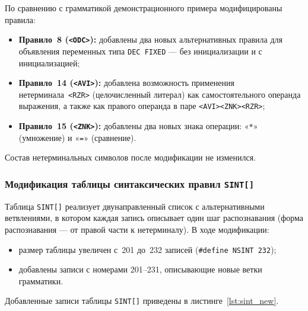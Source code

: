 \documentclass[a4paper,14pt]{extarticle}
\begin{document}
По сравнению с грамматикой демонстрационного примера модифицированы правила:
\begin{itemize}
  \item \textbf{Правило~8 (\texttt{<ODC>}):} добавлены два новых альтернативных
        правила для объявления переменных типа \texttt{DEC FIXED} — без
        инициализации и с инициализацией;
  \item \textbf{Правило~14 (\texttt{<AVI>}):} добавлена возможность применения
        нетерминала~\texttt{<RZR>} (целочисленный литерал) как самостоятельного
        операнда выражения, а также как правого операнда в паре
        \texttt{<AVI><ZNK><RZR>};
  \item \textbf{Правило~15 (\texttt{<ZNK>}):} добавлены два новых знака операции:
        «\texttt{*}» (умножение) и «\texttt{=}» (сравнение).
\end{itemize}

Состав нетерминальных символов после модификации не изменился.

\subsubsection*{Модификация таблицы синтаксических правил \texttt{SINT[]}}

Таблица \texttt{SINT[]} реализует двунаправленный список с альтернативными
ветвлениями, в котором каждая запись описывает один шаг распознавания (форма
распознавания — от правой части к нетерминалу). В ходе модификации:

\begin{itemize}
  \item размер таблицы увеличен с~201 до~232 записей (\texttt{\#define NSINT~232});
  \item добавлены записи с номерами 201--231, описывающие новые ветки грамматики.
\end{itemize}

Добавленные записи таблицы \texttt{SINT[]} приведены в листинге~\ref{lst:sint_new}.
\end{document}
